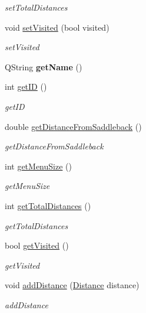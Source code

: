 \begin{DoxyCompactItemize}
\begin{DoxyCompactList}\small\item\em set\+Total\+Distances \end{DoxyCompactList}\item 
void \hyperlink{class_restaurant_a13b2e8a16f44e2fc4304e4b8689e1336}{set\+Visited} (bool visited)
\begin{DoxyCompactList}\small\item\em set\+Visited \end{DoxyCompactList}\item 
\mbox{\label{class_restaurant_a47d4e993832e37a98fd4e3f3201b62c4}} 
Q\+String {\bfseries get\+Name} ()
\item 
int \hyperlink{class_restaurant_a8777e6d48839e275744145f394bde846}{get\+ID} ()
\begin{DoxyCompactList}\small\item\em get\+ID \end{DoxyCompactList}\item 
double \hyperlink{class_restaurant_a328d55dfff742bf89d6b81a01bab35d9}{get\+Distance\+From\+Saddleback} ()
\begin{DoxyCompactList}\small\item\em get\+Distance\+From\+Saddleback \end{DoxyCompactList}\item 
int \hyperlink{class_restaurant_a228a01608b506e6a8bf72b7d6f747a7d}{get\+Menu\+Size} ()
\begin{DoxyCompactList}\small\item\em get\+Menu\+Size \end{DoxyCompactList}\item 
int \hyperlink{class_restaurant_aefc0ab4b34d2ff5cfc5ab0d9463cf224}{get\+Total\+Distances} ()
\begin{DoxyCompactList}\small\item\em get\+Total\+Distances \end{DoxyCompactList}\item 
bool \hyperlink{class_restaurant_a174725e8ae4487dbb649dd9cc017945e}{get\+Visited} ()
\begin{DoxyCompactList}\small\item\em get\+Visited \end{DoxyCompactList}\item 
void \hyperlink{class_restaurant_a35210fa764ffb3ec4c9563c3bb12fd68}{add\+Distance} (\hyperlink{class_distance}{Distance} distance)
\begin{DoxyCompactList}\small\item\em add\+Distance \end{DoxyCompactList}\item 

\end{DoxyCompactItemize}
